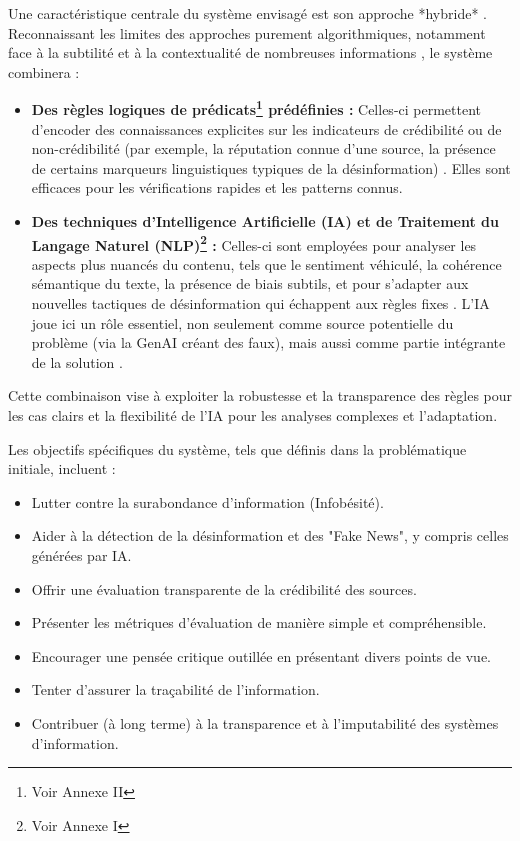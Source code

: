 \documentclass[9pt,twocolumn,french]{article}
\begin{document}
Une caractéristique centrale du système envisagé est son approche *hybride* \citep{Ahmed2025Aidriven}. Reconnaissant les limites des approches purement algorithmiques, notamment face à la subtilité et à la contextualité de nombreuses informations \citep{Nabozny2021, Hagag2023The, Thibault2025A, Pescuma2025}, le système combinera :
\begin{itemize}
    \item \textbf{Des règles logiques de prédicats\footnote{Voir Annexe II} prédéfinies :} Celles-ci permettent d'encoder des connaissances explicites sur les indicateurs de crédibilité ou de non-crédibilité (par exemple, la réputation connue d'une source, la présence de certains marqueurs linguistiques typiques de la désinformation) \citep{Metzger2010, W3CCredibility2018, Kedzie2018}. Elles sont efficaces pour les vérifications rapides et les patterns connus.
    \item \textbf{Des techniques d'Intelligence Artificielle (IA) et de Traitement du Langage Naturel (NLP)\footnote{Voir Annexe I} :} Celles-ci sont employées pour analyser les aspects plus nuancés du contenu, tels que le sentiment véhiculé, la cohérence sémantique du texte, la présence de biais subtils, et pour s'adapter aux nouvelles tactiques de désinformation qui échappent aux règles fixes \citep{Ahmed2025Aidriven}. L'IA joue ici un rôle essentiel, non seulement comme source potentielle du problème (via la GenAI créant des faux), mais aussi comme partie intégrante de la solution \citep{Loth2024, Zhou2022A}.
\end{itemize}
Cette combinaison vise à exploiter la robustesse et la transparence des règles pour les cas clairs et la flexibilité de l'IA pour les analyses complexes et l'adaptation.

Les objectifs spécifiques du système, tels que définis dans la problématique initiale, incluent :
\begin{itemize}
    \item Lutter contre la surabondance d'information (Infobésité).
    \item Aider à la détection de la désinformation et des "Fake News", y compris celles générées par IA.
    \item Offrir une évaluation transparente de la crédibilité des sources.
    \item Présenter les métriques d'évaluation de manière simple et compréhensible.
    \item Encourager une pensée critique outillée en présentant divers points de vue.
    \item Tenter d'assurer la traçabilité de l'information.
    \item Contribuer (à long terme) à la transparence et à l'imputabilité des systèmes d'information.
\end{itemize}
\end{document}
